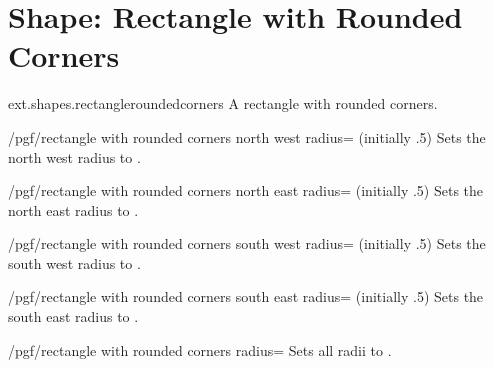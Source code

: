 %
%
%

\section{Shape: Rectangle with Rounded Corners}
\begin{pgflibrary}{ext.shapes.rectangleroundedcorners}
  A rectangle with rounded corners.
\end{pgflibrary}

\begin{key}{/pgf/rectangle with rounded corners north west radius= (initially .5\string\pgflinewidth)}
  Sets the north west radius to .
\end{key}
\begin{key}{/pgf/rectangle with rounded corners north east radius= (initially .5\string\pgflinewidth)}
  Sets the north east radius to .
\end{key}
\begin{key}{/pgf/rectangle with rounded corners south west radius= (initially .5\string\pgflinewidth)}
  Sets the south west radius to .
\end{key}
\begin{key}{/pgf/rectangle with rounded corners south east radius= (initially .5\string\pgflinewidth)}
  Sets the south east radius to .
\end{key}
\begin{key}{/pgf/rectangle with rounded corners radius=}
  Sets all radii to .
\end{key}

